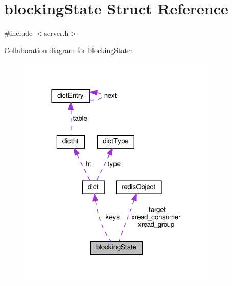 \hypertarget{structblocking_state}{}\section{blocking\+State Struct Reference}
\label{structblocking_state}


{\ttfamily \#include $<$server.\+h$>$}



Collaboration diagram for blocking\+State\+:
\nopagebreak
\begin{figure}[H]
\begin{center}
\leavevmode
\includegraphics[width=270pt]{structblocking_state__coll__graph}
\end{center}
\end{figure}
